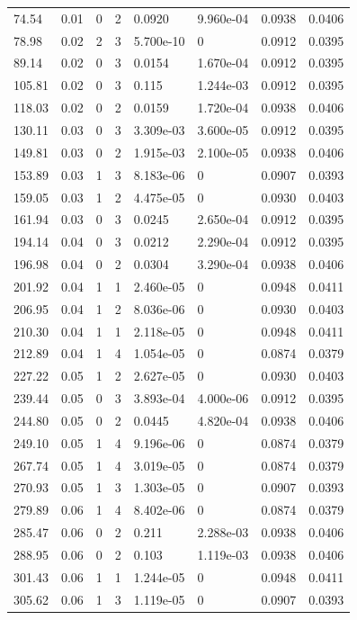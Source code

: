 \documentclass[preview]{standalone}
\begin{document}
{{\begin{tabular}{L{1.2cm}C{1.2cm} C{0.3cm}C{0.5cm} C{1.4cm}C{1.4cm} C{1.4cm}C{1.4cm}}
  74.54  &  0.01  & 0     &  2 &  0.0920  & 9.960e-04  & 0.0938 &  0.0406   \\ 
  78.98  &  0.02  & 2     &  3 &  5.700e-10  & 0  & 0.0912 &  0.0395   \\ 
  89.14  &  0.02  & 0     &  3 &  0.0154  & 1.670e-04  & 0.0912 &  0.0395   \\ 
  105.81  &  0.02  & 0     &  3 &  0.115  & 1.244e-03  & 0.0912 &  0.0395   \\ 
  118.03  &  0.02  & 0     &  2 &  0.0159  & 1.720e-04  & 0.0938 &  0.0406   \\ 
  130.11  &  0.03  & 0     &  3 &  3.309e-03  & 3.600e-05  & 0.0912 &  0.0395   \\ 
  149.81  &  0.03  & 0     &  2 &  1.915e-03  & 2.100e-05  & 0.0938 &  0.0406   \\ 
  153.89  &  0.03  & 1     &  3 &  8.183e-06  & 0  & 0.0907 &  0.0393   \\ 
  159.05  &  0.03  & 1     &  2 &  4.475e-05  & 0  & 0.0930 &  0.0403   \\ 
  161.94  &  0.03  & 0     &  3 &  0.0245  & 2.650e-04  & 0.0912 &  0.0395   \\ 
  194.14  &  0.04  & 0     &  3 &  0.0212  & 2.290e-04  & 0.0912 &  0.0395   \\ 
  196.98  &  0.04  & 0     &  2 &  0.0304  & 3.290e-04  & 0.0938 &  0.0406   \\ 
  201.92  &  0.04  & 1     &  1 &  2.460e-05  & 0  & 0.0948 &  0.0411   \\ 
  206.95  &  0.04  & 1     &  2 &  8.036e-06  & 0  & 0.0930 &  0.0403   \\ 
  210.30  &  0.04  & 1     &  1 &  2.118e-05  & 0  & 0.0948 &  0.0411   \\ 
  212.89  &  0.04  & 1     &  4 &  1.054e-05  & 0  & 0.0874 &  0.0379   \\ 
  227.22  &  0.05  & 1     &  2 &  2.627e-05  & 0  & 0.0930 &  0.0403   \\ 
  239.44  &  0.05  & 0     &  3 &  3.893e-04  & 4.000e-06  & 0.0912 &  0.0395   \\ 
  244.80  &  0.05  & 0     &  2 &  0.0445  & 4.820e-04  & 0.0938 &  0.0406   \\ 
  249.10  &  0.05  & 1     &  4 &  9.196e-06  & 0  & 0.0874 &  0.0379   \\ 
  267.74  &  0.05  & 1     &  4 &  3.019e-05  & 0  & 0.0874 &  0.0379   \\ 
  270.93  &  0.05  & 1     &  3 &  1.303e-05  & 0  & 0.0907 &  0.0393   \\ 
  279.89  &  0.06  & 1     &  4 &  8.402e-06  & 0  & 0.0874 &  0.0379   \\ 
  285.47  &  0.06  & 0     &  2 &  0.211  & 2.288e-03  & 0.0938 &  0.0406   \\ 
  288.95  &  0.06  & 0     &  2 &  0.103  & 1.119e-03  & 0.0938 &  0.0406   \\ 
  301.43  &  0.06  & 1     &  1 &  1.244e-05  & 0  & 0.0948 &  0.0411   \\ 
  305.62  &  0.06  & 1     &  3 &  1.119e-05  & 0  & 0.0907 &  0.0393   \\ 
\hline 
\end{tabular} 

}}
\end{document}
